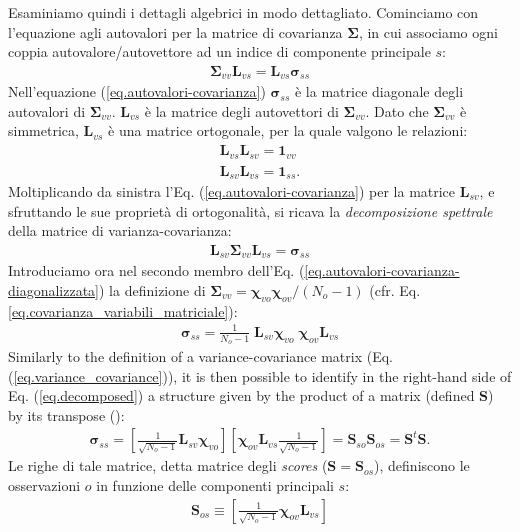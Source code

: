 \documentclass[11pt]{amsart}
\begin{document}
Esaminiamo quindi i dettagli algebrici in modo dettagliato. Cominciamo con l'equazione agli autovalori per la matrice di covarianza $\bm \Sigma$, in cui associamo ogni coppia autovalore/autovettore ad un indice di componente principale $s$:
%
\begin{eqnarray}
\label{eq.autovalori-covarianza}
\bm \Sigma_{vv} \bm L_{vs} = \bm L_{vs} \bm \sigma_{ss} 
\end{eqnarray}
%
Nell'equazione (\ref{eq.autovalori-covarianza}) $\bm \sigma_{ss}$ è la matrice diagonale degli autovalori di $\bm \Sigma_{vv}$. $\bm L_{vs}$ è la matrice degli autovettori di $\bm \Sigma_{vv}$. Dato che $\bm \Sigma_{vv}$ è simmetrica, $\bm L_{vs}$ è una matrice ortogonale, per la quale valgono le relazioni:
%
\begin{eqnarray}
\bm L_{vs} \bm L_{sv}  = \bm 1_{vv}
\\ \nonumber
\bm L_{sv} \bm L_{vs}  = \bm 1_{ss}. 
\end{eqnarray}
%
Moltiplicando da sinistra l'Eq. (\ref{eq.autovalori-covarianza}) per la matrice $\bm L_{sv}$, e sfruttando le sue proprietà di ortogonalità, si ricava la {\em decomposizione spettrale} della matrice di varianza-covarianza:
%
\begin{eqnarray}
\label{eq.autovalori-covarianza-diagonalizzata}
\bm L_{sv} \bm \Sigma_{vv} \bm L_{vs}
=
\bm \sigma_{ss}
\end{eqnarray}
%
Introduciamo ora nel secondo membro dell'Eq. (\ref{eq.autovalori-covarianza-diagonalizzata}) la definizione di $\bm \Sigma_{vv} = \bm \chi_{vo} \bm \chi_{ov} / (N_o-1)$ (cfr. Eq. \ref{eq.covarianza_variabili_matriciale}): 
%
\begin{eqnarray}
\label{eq.decomposed}
\bm \sigma_{ss} =
\frac{1}{N_o - 1} \; \bm L_{sv} \bm \chi_{vo} \; \bm \chi_{ov} \bm L_{vs} 
\end{eqnarray}
%
Similarly to the definition of a variance-covariance matrix (Eq. (\ref{eq.variance_covariance})), it is then possible to identify in the right-hand side of Eq. (\ref{eq.decomposed}) a structure given by the product of a matrix (defined $\bm S$) by its transpose ():
%
\begin{eqnarray}
\bm \sigma_{ss}
=
\left[ \frac{1}{\sqrt{N_o - 1}} \bm L_{sv} \bm \chi_{vo} \right]
\left[ \bm \chi_{ov} \bm L_{vs} \frac{1}{\sqrt{N_o - 1}} \right] 
=
\bm S_{so} \bm S_{os}
=
\bm S^t \bm S.
\end{eqnarray}
%
Le righe di tale matrice, detta matrice degli {\em scores} ($\bm S = \bm S_{os}$), definiscono le  osservazioni $o$ in funzione delle componenti principali $s$:
%
\begin{eqnarray}
\label{eq.scores}
\bm S_{os} \equiv \left[ \frac{1}{\sqrt{N_o - 1}} \bm \chi_{ov} \bm L_{vs} \right]
\end{eqnarray}
\end{document}
